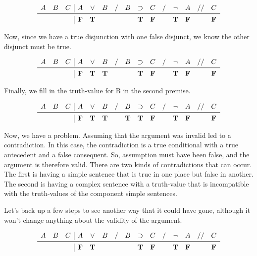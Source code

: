 \documentclass[../logic-text.tex]{subfiles}
\begin{document}
\[
\begin{array}{ccc|cccccccccccc}
  A&B&C& A & \lor & B & / & B & \lif & C & / & \lneg & A & // & C \\ \midrule
  &&& \false & \true &&&& \true & \false && \true & \false && \false \\
\end{array}
\]

Now, since we have a true disjunction with one false disjunct, we know the other disjunct must be true.

\[
\begin{array}{ccc|cccccccccccc}
  A&B&C& A & \lor & B & / & B & \lif & C & / & \lneg & A & // & C \\ \midrule
  &&& \false & \true & \true &&& \true & \false && \true & \false && \false \\
\end{array}
\]

Finally, we fill in the truth-value for B in the second premise.

\[
\begin{array}{ccc|cccccccccccc}
  A&B&C& A & \lor & B & / & B & \lif & C & / & \lneg & A & // & C \\ \midrule
  &&& \false & \true & \true && \true & \true & \false && \true & \false && \false \\
\end{array}
\]

Now, we have a problem. Assuming that the argument was invalid led to a contradiction. In this case, the contradiction is a true conditional with a true antecedent and a false consequent. So, assumption must have been false, and the argument is therefore valid.
There are two kinds of contradictions that can occur.
The first is having a simple sentence that is true in one place but false in another.
The second is having a complex sentence with a truth-value that is incompatible with the truth-values of the component simple sentences.

Let's back up a few steps to see another way that it could have gone, although it won't change anything about the validity of the argument.

\[
\begin{array}{ccc|cccccccccccc}
  A&B&C& A & \lor & B & / & B & \lif & C & / & \lneg & A & // & C \\ \midrule
  &&& \false & \true &&&& \true & \false && \true & \false && \false \\
\end{array}
\]
\end{document}
